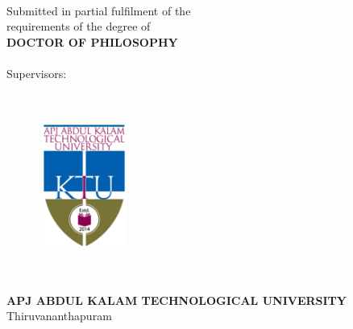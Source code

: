 \thispagestyle{empty}
\graphicspath{{Figures/PNG/}{Figures/}}
\doublespacing
\begin{center}
\vspace{12mm}
{\fontsize{22pt}{26pt}\textbf{\thetitle}} \\
\vspace{8mm}
{Submitted in partial fulfilment of the \\ requirements of the degree of} \\
\vspace{8mm}
\large
{\textbf{DOCTOR OF PHILOSOPHY}} \\
\vspace{5mm}
\fontsize{15pt}{18pt}{{\thescholar} \\ { (\theregnumber)}} \\

Supervisors: \\
{\thesupervisor\\ }
{\thecosupervisor\\ }
\vspace{5mm}
\begin{figure}[h!]
\centering

\includegraphics[height=4cm,width=3cm]{Figures/ktu_logo.png}
\end{figure}
\par\vspace{4mm}
{ \thedepartment\\

\thecollege\\
\textbf {\large {APJ ABDUL KALAM TECHNOLOGICAL UNIVERSITY}}\\

Thiruvananthapuram \\
\theyear}

\end{center}
\thispagestyle{empty}
\onehalfspacing